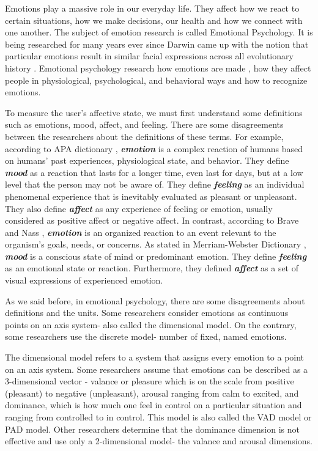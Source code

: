 \documentclass[../main.tex]{subfiles}
\begin{document}
Emotions play a massive role in our everyday life. 
They affect how we react to certain situations, how we make decisions,
our health and how we connect with one another. 
The subject of emotion research is called Emotional Psychology. 
It is being researched for many years ever since Darwin came up with the notion that 
particular emotions result in similar facial expressions across all evolutionary history \cite{Darwin_book}. 
Emotional psychology research how emotions are made \cite{barrett2017emotions}, 
how they affect people in physiological, psychological, and behavioral ways and how to recognize emotions.
\par

To measure the user's affective state, we must first understand some definitions such as
emotions, mood, affect, and feeling.
There are some disagreements between the researchers about the definitions of these terms.
For example, according to APA dictionary \cite{APA_dictionary}, 
\textbf{\emph{emotion}} is a complex reaction of humans based on humans' past experiences,
physiological state, and behavior. 
They define \textbf{\emph{mood}} as a reaction that lasts for a longer time, even last for days,
but at a low level that the person may not be aware of. 
They define \textbf{\emph{feeling}} as an individual phenomenal experience that is 
inevitably evaluated as pleasant or unpleasant. 
They also define \textbf{\emph{affect}} as any experience of feeling or emotion,
usually considered as positive affect or negative affect.
In contrast, according to Brave and Nass \cite{human_computer_interaction}, 
\textbf{\emph{emotion}} is an organized reaction to an event relevant to the organism's goals, needs, or concerns. 
As stated in Merriam-Webster Dictionary \cite{MW-Dictionary}, 
\textbf{\emph{mood}} is a conscious state of mind or predominant emotion. 
They define \textbf{\emph{feeling}} as an emotional state or reaction. 
Furthermore, they defined \textbf{\emph{affect}} as a set of visual expressions of experienced emotion.
\par


As we said before, in emotional psychology, there are some disagreements about definitions and the units.
Some researchers consider emotions as continuous points on an axis system- also called 
the dimensional model. On the contrary, some researchers use the discrete model-
number of fixed, named emotions.
\par

The dimensional model refers to a system that assigns every emotion to a point on an axis system. 
Some researchers assume that emotions can be described as a 3-dimensional vector \cite{VAD_model}- 
valance or pleasure which is on the scale from positive (pleasant) to negative (unpleasant), 
arousal ranging from calm to excited, and dominance, which is how much one feel in control on a 
particular situation and ranging from controlled to in control. This model is also called the VAD model or PAD model. 
Other researchers \cite{VA_model} determine that the dominance dimension is not effective and
use only a 2-dimensional model- the valance and arousal dimensions.
\par
\end{document}
